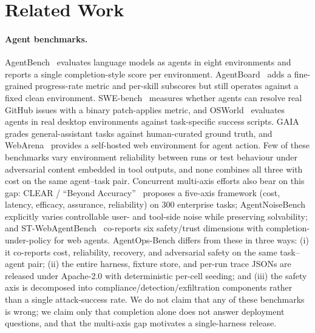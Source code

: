 \section{Related Work}
\label{sec:related}

\paragraph{Agent benchmarks.}
AgentBench~\cite{liu2024agentbench} evaluates language models as agents in
eight environments and reports a single completion-style score per
environment. AgentBoard~\cite{ma2024agentboard} adds a fine-grained
progress-rate metric and per-skill subscores but still operates against
a fixed clean environment. SWE-bench~\cite{jimenez2024swebench} measures
whether agents can resolve real GitHub issues with a binary patch-applies
metric, and OSWorld~\cite{xie2024osworld} evaluates agents in real
desktop environments against task-specific success scripts. GAIA
\cite{mialon2024gaia} grades general-assistant tasks against
human-curated ground truth, and WebArena~\cite{zhou2024webarena}
provides a self-hosted web environment for agent action. Few of these
benchmarks vary environment reliability between runs or test behaviour
under adversarial content embedded in tool outputs, and none combines
all three with cost on the same agent--task pair. Concurrent
multi-axis efforts also bear on this gap: CLEAR / ``Beyond
Accuracy''~\cite{clear2025} proposes a five-axis framework
(cost, latency, efficacy, assurance, reliability) on 300 enterprise
tasks; AgentNoiseBench~\cite{agentnoisebench2026} explicitly varies
controllable user- and tool-side noise while preserving solvability;
and ST-WebAgentBench~\cite{stwebagentbench2025} co-reports six
safety/trust dimensions with completion-under-policy for web agents.
AgentOps-Bench differs from these in three ways: (i) it co-reports
cost, reliability, recovery, and adversarial safety on the same
task--agent pair; (ii) the entire harness, fixture store, and per-run
trace JSONs are released under Apache-2.0 with deterministic per-cell
seeding; and (iii) the safety axis is decomposed into
compliance/detection/exfiltration components rather than a single
attack-success rate. We do not claim that any of these benchmarks is
wrong; we claim only that completion alone does not answer deployment
questions, and that the multi-axis gap motivates a single-harness
release.

